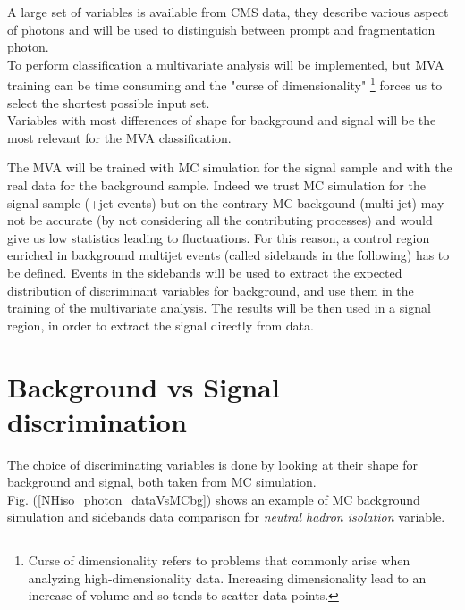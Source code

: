 \label{sec:unchapitre}

A large set of variables is available from CMS data, they describe various aspect of photons and will be used to
distinguish between prompt and fragmentation photon.\\
To perform classification a multivariate analysis will be implemented, but MVA training can be time consuming and the "curse of
dimensionality" \footnote{Curse of dimensionality refers to problems that commonly arise when analyzing high-dimensionality data.
Increasing dimensionality lead to an increase of volume and so tends to scatter data points.} forces us to select the shortest possible input set.\\

Variables with most differences of shape for background and signal will be the most relevant for the MVA classification.



The MVA will be trained with MC simulation for the signal sample and with the real data for the background sample.
Indeed we trust MC simulation for the signal sample (\textgamma+jet events)
but on the contrary MC backgound (multi-jet) may not be accurate (by not considering all the contributing processes)
and would give us low statistics leading to fluctuations.
For this reason, a control region enriched in background multijet events (called sidebands in the following) has to be
defined.
Events in the sidebands will be used to extract the expected distribution of discriminant variables for background, and use them in the training of the multivariate analysis. The results will be then used in a signal region, in order to extract the signal directly from data.

\section{Background vs Signal discrimination}

The choice of discriminating variables is done by looking at their shape for background and signal, both taken from MC simulation.\\
Fig. (\ref{NHiso_photon_dataVsMCbg}) shows an example of MC background simulation and sidebands data comparison for \emph{neutral hadron isolation} variable. \\

